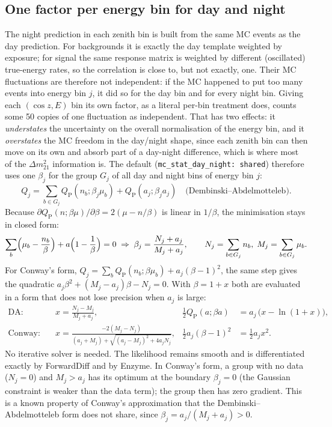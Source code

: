 \documentclass[11pt,a4paper]{article}
\newcommand{\QP}{Q_{\mathrm{P}}}
\newcommand{\code}[1]{\texttt{#1}}
\begin{document}
\subsection{One factor per energy bin for day and night}

The night prediction in each zenith bin is built from the same MC events as the day prediction.
For backgrounds it is exactly the day template weighted by exposure; for signal the same response
matrix is weighted by different (oscillated) true-energy rates, so the correlation is close to,
but not exactly, one. Their MC fluctuations are therefore not independent: if the MC happened to
put too many events into energy bin $j$, it did so for the day bin and for every night bin. Giving
each $(\cos z, E)$ bin its own factor, as a literal per-bin treatment does, counts some 50 copies
of one fluctuation as independent. That has two effects: it \emph{understates} the uncertainty on
the overall normalisation of the energy bin, and it \emph{overstates} the MC freedom in the
day/night shape, since each zenith bin can then move on its own and absorb part of a day-night
difference, which is where most of the $\Delta m^2_{21}$ information is. The default
(\code{mc\_stat\_day\_night: shared}) therefore uses one $\beta_j$ for the group $G_j$ of all day
and night bins of energy bin $j$:
\begin{equation}
  Q_j = \sum_{b\in G_j}\QP(n_b;\beta_j\mu_b) + \QP(a_j;\beta_j a_j)
  \quad\text{(Dembinski--Abdelmotteleb)}.
\end{equation}
Because $\partial\QP(n;\beta\mu)/\partial\beta = 2(\mu - n/\beta)$ is linear in $1/\beta$, the
minimisation stays in closed form:
\begin{equation}
  \sum_b\Bigl(\mu_b - \frac{n_b}{\beta}\Bigr) + a\Bigl(1-\frac1\beta\Bigr) = 0
  \;\Rightarrow\;
  \beta_j = \frac{N_j + a_j}{M_j + a_j}, \qquad N_j=\sum_{b\in G_j} n_b,\; M_j = \sum_{b\in G_j}\mu_b .
\end{equation}
For Conway's form, $Q_j = \sum_b\QP(n_b;\beta\mu_b) + a_j(\beta-1)^2$, the same step gives the
quadratic $a_j\beta^2 + (M_j-a_j)\beta - N_j = 0$. With $\beta = 1+x$ both are evaluated in a
form that does not lose precision when $a_j$ is large:
\begin{align}
  \text{DA:}&\quad x = \frac{N_j - M_j}{M_j + a_j}, &\tfrac12\QP(a;\beta a) &= a_j\,\bigl(x - \ln(1+x)\bigr),\\
  \text{Conway:}&\quad x = \frac{-2(M_j-N_j)}{(a_j+M_j) + \sqrt{(a_j-M_j)^2 + 4a_jN_j}}, &
  \tfrac12 a_j(\beta-1)^2 &= \tfrac12 a_j x^2 .
\end{align}
No iterative solver is needed. The likelihood remains smooth and is differentiated exactly by
ForwardDiff and by Enzyme. In Conway's form, a group with no data ($N_j=0$) and $M_j > a_j$ has its
optimum at the boundary $\beta_j = 0$ (the Gaussian constraint is weaker than the data term); the
group then has zero gradient. This is a known property of Conway's approximation that the
Dembinski--Abdelmotteleb form does not share, since $\beta_j = a_j/(M_j+a_j) > 0$.
\end{document}
